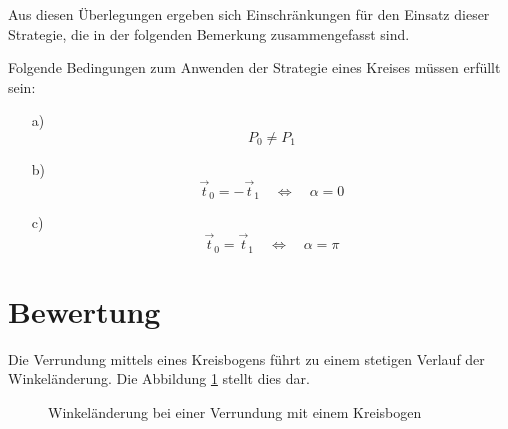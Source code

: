 
\bigskip

Aus diesen Überlegungen ergeben sich Einschränkungen für den Einsatz dieser Strategie, die in der folgenden Bemerkung zusammengefasst sind.


\bigskip



\Bemerkung
{
  Folgende Bedingungen zum Anwenden der Strategie eines Kreises müssen erfüllt sein:

  \begin{itemize}
    \item [a)] $$P_0 \neq P_1$$
    \item [b)] $$ \vec{t}_0 = -\vec{t}_1\quad \Leftrightarrow \quad \alpha = 0$$
    \item [c)] $$ \vec{t}_0 =  \vec{t}_1\quad \Leftrightarrow \quad \alpha = \pi$$
  \end{itemize}
}


\section{Bewertung}

Die Verrundung mittels eines Kreisbogens führt zu einem stetigen Verlauf der Winkeländerung. Die Abbildung \ref{KreisstrategieWinkel} stellt dies dar.

\bigskip

\begin{figure}
  \begin{center}
  \end{center}
  \caption{Winkeländerung bei einer  Verrundung mit einem Kreisbogen }\label{KreisstrategieWinkel}
\end{figure}

\bigskip

